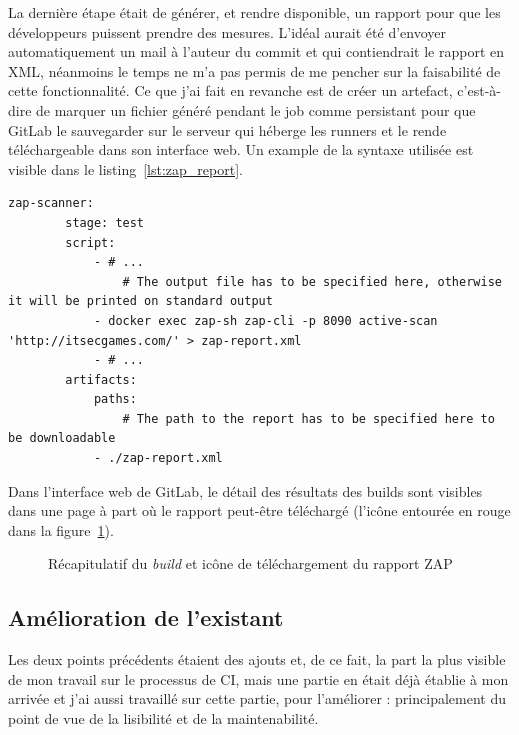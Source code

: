 La dernière étape était de générer, et rendre disponible, un rapport pour que les développeurs puissent prendre des mesures. L'idéal aurait été d'envoyer automatiquement un mail à l'auteur du commit et qui contiendrait le rapport en XML, néanmoins le temps ne m'a pas permis de me pencher sur la faisabilité de cette fonctionnalité. Ce que j'ai  fait en revanche est de créer un artefact, c'est-à-dire de marquer un fichier généré pendant le job comme persistant pour que GitLab le sauvegarder sur le serveur qui héberge les runners et le rende téléchargeable dans son interface web. Un example de la syntaxe utilisée est visible dans le listing~\ref{lst:zap_report}.
\begin{minipage}{\linewidth}
	\begin{lstlisting}[caption={Extrait de code qui lance un scanner ZAP en ligne de commande et rend le rapport disponible sur GitLab},label={lst:zap_report}]
		zap-scanner:
		stage: test
		script:
			- # ...
				# The output file has to be specified here, otherwise it will be printed on standard output
			- docker exec zap-sh zap-cli -p 8090 active-scan 'http://itsecgames.com/' > zap-report.xml 
			- # ...
		artifacts:
			paths:
				# The path to the report has to be specified here to be downloadable 
			- ./zap-report.xml
\end{lstlisting}
\end{minipage}

Dans l'interface web de GitLab, le détail des résultats des builds sont visibles dans une page à part où le rapport peut-être téléchargé (l'icône entourée en rouge dans la figure~\ref{fig:gitlab_build_recap}).
\begin{figure}
  \centering
  \caption{Récapitulatif du \textit{build} et icône de téléchargement du rapport ZAP}
  \label{fig:gitlab_build_recap}
\end{figure}

\subsection{Amélioration de l'existant}
Les deux points précédents étaient des ajouts et, de ce fait, la part la plus visible de mon travail sur le processus de CI, mais une partie en était déjà établie à mon arrivée et j'ai aussi travaillé sur cette partie, pour l'améliorer : principalement du point de vue de la lisibilité et de la maintenabilité.

